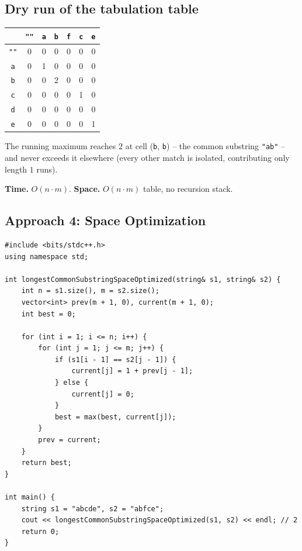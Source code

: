 \subsection*{Dry run of the tabulation table}


\begin{center}
\begin{tabular}{c|c|c|c|c|c|c}
 & \texttt{""} & \texttt{a} & \texttt{b} & \texttt{f} & \texttt{c} & \texttt{e} \\ \hline
\texttt{""} & 0 & 0 & 0 & 0 & 0 & 0 \\ \hline
\texttt{a} & 0 & 1 & 0 & 0 & 0 & 0 \\ \hline
\texttt{b} & 0 & 0 & 2 & 0 & 0 & 0 \\ \hline
\texttt{c} & 0 & 0 & 0 & 0 & 1 & 0 \\ \hline
\texttt{d} & 0 & 0 & 0 & 0 & 0 & 0 \\ \hline
\texttt{e} & 0 & 0 & 0 & 0 & 0 & 1
\end{tabular}
\end{center}

The running maximum reaches $2$ at cell (\texttt{b}, \texttt{b}) --
the common substring \texttt{"ab"} -- and never exceeds it elsewhere
(every other match is isolated, contributing only length $1$ runs).

\begin{complexitybox}
\textbf{Time.} $O(n \cdot m)$.
\textbf{Space.} $O(n \cdot m)$ table, no recursion stack.
\end{complexitybox}

\subsection*{Approach 4: Space Optimization}

\begin{lstlisting}
#include <bits/stdc++.h>
using namespace std;

int longestCommonSubstringSpaceOptimized(string& s1, string& s2) {
    int n = s1.size(), m = s2.size();
    vector<int> prev(m + 1, 0), current(m + 1, 0);
    int best = 0;

    for (int i = 1; i <= n; i++) {
        for (int j = 1; j <= m; j++) {
            if (s1[i - 1] == s2[j - 1]) {
                current[j] = 1 + prev[j - 1];
            } else {
                current[j] = 0;
            }
            best = max(best, current[j]);
        }
        prev = current;
    }
    return best;
}

int main() {
    string s1 = "abcde", s2 = "abfce";
    cout << longestCommonSubstringSpaceOptimized(s1, s2) << endl; // 2
    return 0;
}
\end{lstlisting}

